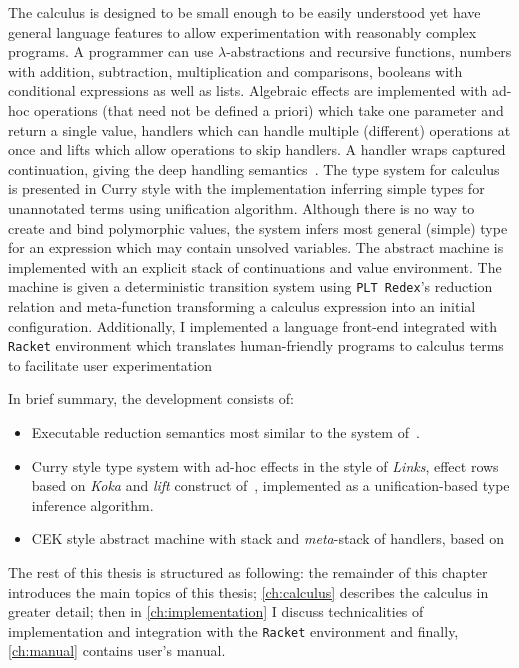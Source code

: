 \documentclass[inz, english, longabstract]{iithesis}
\newcommand{\Redex}{\texttt{PLT Redex}}
\newcommand{\Racket}{\texttt{Racket}}
\begin{document}
The calculus is designed to be small enough to be easily understood yet have general language features to allow experimentation with reasonably complex programs.
A programmer can use $\lambda$-abstractions and recursive functions, numbers with addition, subtraction, multiplication and comparisons, booleans with conditional expressions as well as lists.
Algebraic effects are implemented with ad-hoc operations (that need not be defined a priori) which take one parameter and return a single value, handlers which can handle multiple (different) operations at once and lifts which allow operations to skip handlers.
A handler wraps captured continuation, giving the deep handling semantics~\cite{Leijen2014}.
The type system for calculus is presented in Curry style with the implementation inferring simple types for unannotated terms using unification algorithm.
Although there is no way to create and bind polymorphic values, the system infers most general (simple) type for an expression which may contain unsolved variables.
The abstract machine is implemented with an explicit stack of continuations and value environment.
The machine is given a deterministic transition system using \Redex{}'s reduction relation and meta-function transforming a calculus expression into an initial configuration.
Additionally, I implemented a language front-end integrated with \Racket{} environment which translates human-friendly programs to calculus terms to facilitate user experimentation

In brief summary, the development consists of:
\begin{itemize}
  \item Executable reduction semantics most similar to the system of~\cite{Biernacki2017}.
  \item Curry style type system with ad-hoc effects in the style of \emph{Links}, effect rows based on \emph{Koka} and \emph{lift} construct of~\cite{Biernacki2017}, implemented as a unification-based type inference algorithm.
  \item CEK style abstract machine with stack and \emph{meta}-stack of handlers, based on~\cite{Hillerstrom2016}
\end{itemize}

The rest of this thesis is structured as following: the remainder of this chapter introduces the main topics of this thesis; \autoref{ch:calculus} describes the calculus in greater detail; then in \autoref{ch:implementation} I discuss technicalities of implementation and integration with the \Racket{} environment and finally, \autoref{ch:manual} contains user's manual.
\end{document}
